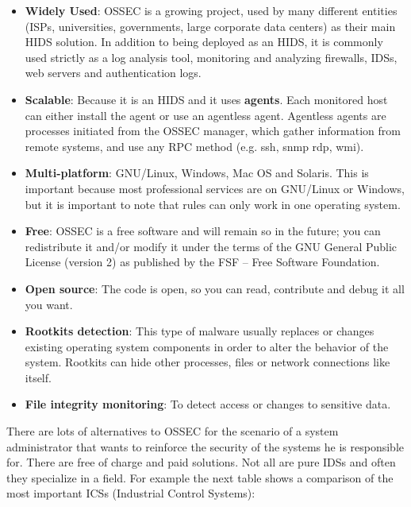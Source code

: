 \begin{itemize}
	\item \textbf{Widely Used}: OSSEC is a growing project, used by many different entities (ISPs, universities, governments, large corporate data centers) as their main HIDS solution. In addition to being deployed as an HIDS, it is commonly used strictly as a log analysis tool, monitoring and analyzing firewalls, IDSs, web servers and authentication logs.
	\item \textbf{Scalable}: Because it is an HIDS and it uses \textbf{agents}. Each monitored host can either install the agent or use an agentless agent\cite{agentless}\cite{ossec_agent}. Agentless agents are processes initiated from the OSSEC manager, which gather information from remote systems, and use any RPC method (e.g. ssh, snmp rdp, wmi).
	\item \textbf{Multi-platform}: GNU/Linux, Windows, Mac OS and Solaris. This is important because most professional services are on GNU/Linux or Windows, but it is important to note that rules can only work in one operating system.
	\item \textbf{Free}: OSSEC is a free software and will remain so in the future; you can redistribute it and/or modify it under the terms of the GNU General Public License (version 2) as published by the FSF -- Free Software Foundation.
	\item \textbf{Open source}: The code is open, so you can read, contribute and debug it all you want.
	\item \textbf{Rootkits detection}: This type of malware usually replaces or changes existing operating system components in order to alter the behavior of the system. Rootkits can hide other processes, files or network connections like itself.
	\item \textbf{File integrity monitoring}: To detect access or changes to sensitive data.
\end{itemize}
\linej
There are lots of alternatives to OSSEC for the scenario of a system administrator that wants to reinforce the security of the systems he is responsible for. There are free of charge and paid solutions. Not all are pure IDSs and often they specialize in a field. For example the next table shows a comparison of the most important ICSs (Industrial Control Systems):
